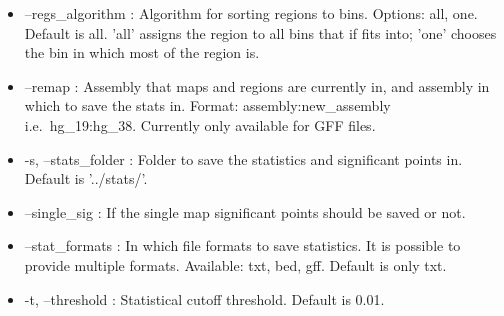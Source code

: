 \begin{itemize}
\item --regs\_algorithm : Algorithm for sorting regions to bins. Options: all, one. Default is all. 'all' assigns the region to all bins that if fits into; 'one' chooses the bin in which most of the region is.
\item --remap : Assembly that maps and regions are currently in, and assembly in which to save the stats in. Format:
assembly:new\_assembly i.e.~hg\_19:hg\_38. Currently only available for GFF files.
\item -s, --stats\_folder : Folder to save the statistics and significant points in. Default is '../stats/'.
\item --single\_sig : If the single map significant points should be saved or not.
\item --stat\_formats : In which file formats to save statistics. It is possible to provide multiple formats. Available:
txt, bed, gff. Default is only txt.
\item -t, --threshold : Statistical cutoff threshold. Default is 0.01.
\end{itemize}



